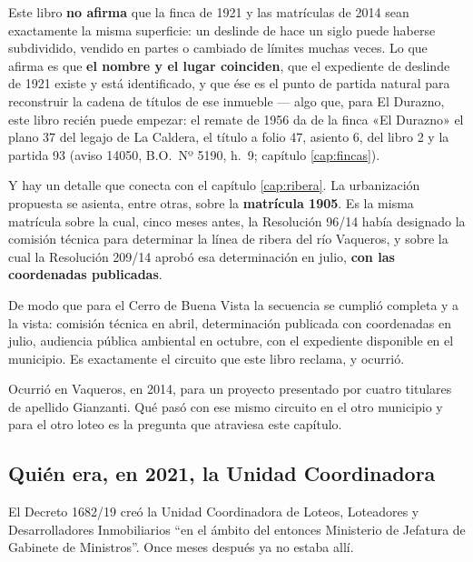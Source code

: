 \begin{cautela}
Este libro \textbf{no afirma} que la finca de 1921 y las matrículas de 2014 sean exactamente la misma superficie: un deslinde de hace un siglo puede haberse subdividido, vendido en partes o cambiado de límites muchas veces. Lo que afirma es que \textbf{el nombre y el lugar coinciden}, que el expediente de deslinde de 1921 existe y está identificado, y que ése es el punto de partida natural para reconstruir la cadena de títulos de ese inmueble --- algo que, para El Durazno, este libro recién puede empezar: el remate de 1956 da de la finca «El Durazno» el plano 37 del legajo de La Caldera, el título a folio 47, asiento 6, del libro 2 y la partida 93 (aviso 14050, B.O.\ Nº 5190, h.\ 9; capítulo \ref{cap:fincas}).
\end{cautela}

Y hay un detalle que conecta con el capítulo \ref{cap:ribera}. La urbanización propuesta se asienta, entre otras, sobre la \textbf{matrícula 1905}. Es la misma matrícula sobre la cual, cinco meses antes, la Resolución 96/14 había designado la comisión técnica para determinar la línea de ribera del río Vaqueros, y sobre la cual la Resolución 209/14 aprobó esa determinación en julio, \textbf{con las coordenadas publicadas}.

De modo que para el Cerro de Buena Vista la secuencia se cumplió completa y a la vista: comisión técnica en abril, determinación publicada con coordenadas en julio, audiencia pública ambiental en octubre, con el expediente disponible en el municipio. Es exactamente el circuito que este libro reclama, y ocurrió.

Ocurrió en Vaqueros, en 2014, para un proyecto presentado por cuatro titulares de apellido Gianzanti. Qué pasó con ese mismo circuito en el otro municipio y para el otro loteo es la pregunta que atraviesa este capítulo.

\subsection*{Quién era, en 2021, la Unidad Coordinadora}

El Decreto 1682/19 creó la Unidad Coordinadora de Loteos, Loteadores y Desarrolladores Inmobiliarios ``en el ámbito del entonces Ministerio de Jefatura de Gabinete de Ministros''. Once meses después ya no estaba allí.

